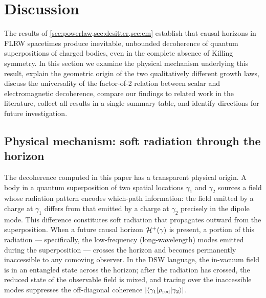 
\section{Discussion}
\label{sec:discussion}

The results of \cref{sec:powerlaw,sec:desitter,sec:em} establish that causal
horizons in FLRW spacetimes produce inevitable, unbounded decoherence of quantum
superpositions of charged bodies, even in the complete absence of Killing
symmetry.  In this section we examine the physical mechanism underlying this
result, explain the geometric origin of the two qualitatively different growth
laws, discuss the universality of the factor-of-2 relation between scalar and
electromagnetic decoherence, compare our findings to related work in the
literature, collect all results in a single summary table, and identify
directions for future investigation.

\subsection{Physical mechanism: soft radiation through the horizon}
\label{sec:discussion-mechanism}

The decoherence computed in this paper has a transparent physical origin.
A body in a quantum superposition of two spatial locations $\gamma_1$ and
$\gamma_2$ sources a field whose radiation pattern encodes which-path information:
the field emitted by a charge at $\gamma_1$ differs from that emitted by a charge
at $\gamma_2$ precisely in the dipole mode.  This difference constitutes soft
radiation that propagates outward from the superposition.  When a future causal
horizon $\mathcal{H}^+(\gamma)$ is present, a portion of this radiation — specifically,
the low-frequency (long-wavelength) modes emitted during the superposition — crosses
the horizon and becomes permanently inaccessible to any comoving observer.  In the
DSW language, the in-vacuum field is in an entangled state across the horizon; after
the radiation has crossed, the reduced state of the observable field is mixed, and
tracing over the inaccessible modes suppresses the off-diagonal coherence
$|\langle \gamma_1 | \rho_{\rm red} | \gamma_2 \rangle|$.


